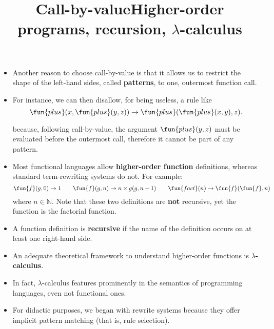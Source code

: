 \documentclass[wide]{slides}
\begin{document}
\begin{slide}
  \title{Call-by-value}

  \begin{itemize}

    \item Another reason to choose call-by-value is that it allows us
      to restrict the shape of the left\hyp{}hand sides, called
      \textbf{patterns}, to one, outermost function call.

    \item For instance, we can then disallow, for being useless, a
      rule like
      \bigskip
      \begin{equation*}
        \fun{plus}(x,\fun{plus}(y,z)) \rightarrow
        \fun{plus}(\fun{plus}(x,y),z).
      \end{equation*}
      \smallskip

      \noindent because, following call\hyp{}by\hyp{}value, the argument
      \(\fun{plus}(y,z)\) must be evaluated before the outermost call,
      therefore it cannot be part of any pattern.

  \end{itemize}

\end{slide}

\begin{slide}
  \title{Higher-order programs, recursion, $\lambda$-calculus}

  \begin{itemize}

    \item Most functional languages allow \textbf{higher\hyp{}order
      function} definitions, whereas standard term\hyp{}rewriting
      systems do not. For example:
      \begin{equation*}
        \fun{f}(g,0) \rightarrow 1
        \qquad
        \fun{f}(g,n) \rightarrow n \times g(g,n-1)
        \qquad
        \fun{fact}(n) \rightarrow \fun{f}(\fun{f},n)
      \end{equation*}
      where \(n \in \mathbb{N}\). Note that these two definitions are
      \textbf{not} recursive, yet the function  is the
      factorial function.

    \item A function definition is \textbf{recursive} if the name of
      the definition occurs on at least one right\hyp{}hand side.

    \item An adequate theoretical framework to understand
      higher\hyp{}order functions is \textbf{\(\lambda\)-calculus}.

    \item In fact, \(\lambda\)-calculus features prominently in the
      semantics of programming languages, even not functional ones.

    \item For didactic purposes, we began with rewrite systems because
      they offer implicit pattern matching (that is, rule selection).

  \end{itemize}

\end{slide}
\end{document}
